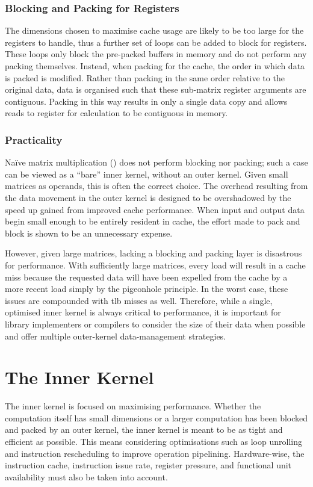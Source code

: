 \documentclass[\main/thesis.tex]{subfiles}
\begin{document}
\subsubsection{Blocking and Packing for Registers}
The dimensions chosen to maximise cache usage are likely to be too large for the registers to handle, thus a further set of loops can be added to block for registers.
These loops only block the pre-packed buffers in memory and do not perform any packing themselves.
Instead, when packing for the cache, the order in which data is packed is modified.
Rather than packing in the same order relative to the original data, data is organised such that these sub-matrix register arguments are contiguous.
Packing in this way results in only a single data copy and allows reads to register for calculation to be contiguous in memory.

\subsubsection{Practicality}
Na\"ive matrix multiplication (\ie {}) does not perform blocking nor packing; such a case can be viewed as a ``bare'' inner kernel, without an outer kernel.
Given small matrices as operands, this is often the correct choice.
The overhead resulting from the data movement in the outer kernel is designed to be overshadowed by the speed up gained from improved cache performance.
When input and output data begin small enough to be entirely resident in cache, the effort made to pack and block is shown to be an unnecessary expense.

However, given large matrices, lacking a blocking and packing layer is disastrous for performance.
With sufficiently large matrices, every load will result in a cache miss because the requested data will have been expelled from the cache by a more recent load simply by the pigeonhole principle.
In the worst case, these issues are compounded with \gls{tlb} misses as well.
Therefore, while a single, optimised inner kernel is always critical to performance, it is important for library implementers or compilers to consider the size of their data when possible and offer multiple outer-kernel data-management strategies.

\section{The Inner Kernel}
The inner kernel is focused on maximising performance.
Whether the computation itself has small dimensions or a larger computation has been blocked and packed by an outer kernel, the inner kernel is meant to be as tight and efficient as possible.
This means considering optimisations such as loop unrolling and instruction rescheduling to improve operation pipelining.
Hardware-wise, the instruction cache, instruction issue rate, register pressure, and functional unit availability must also be taken into account.
\end{document}
